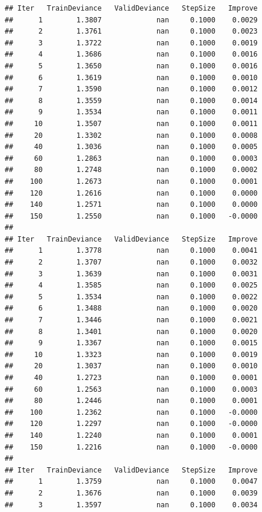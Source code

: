 \documentclass[]{article}
\begin{document}
\begin{verbatim}
## Iter   TrainDeviance   ValidDeviance   StepSize   Improve
##      1        1.3807             nan     0.1000    0.0029
##      2        1.3761             nan     0.1000    0.0023
##      3        1.3722             nan     0.1000    0.0019
##      4        1.3686             nan     0.1000    0.0016
##      5        1.3650             nan     0.1000    0.0016
##      6        1.3619             nan     0.1000    0.0010
##      7        1.3590             nan     0.1000    0.0012
##      8        1.3559             nan     0.1000    0.0014
##      9        1.3534             nan     0.1000    0.0011
##     10        1.3507             nan     0.1000    0.0011
##     20        1.3302             nan     0.1000    0.0008
##     40        1.3036             nan     0.1000    0.0005
##     60        1.2863             nan     0.1000    0.0003
##     80        1.2748             nan     0.1000    0.0002
##    100        1.2673             nan     0.1000    0.0001
##    120        1.2616             nan     0.1000    0.0000
##    140        1.2571             nan     0.1000    0.0000
##    150        1.2550             nan     0.1000   -0.0000
## 
## Iter   TrainDeviance   ValidDeviance   StepSize   Improve
##      1        1.3778             nan     0.1000    0.0041
##      2        1.3707             nan     0.1000    0.0032
##      3        1.3639             nan     0.1000    0.0031
##      4        1.3585             nan     0.1000    0.0025
##      5        1.3534             nan     0.1000    0.0022
##      6        1.3488             nan     0.1000    0.0020
##      7        1.3446             nan     0.1000    0.0021
##      8        1.3401             nan     0.1000    0.0020
##      9        1.3367             nan     0.1000    0.0015
##     10        1.3323             nan     0.1000    0.0019
##     20        1.3037             nan     0.1000    0.0010
##     40        1.2723             nan     0.1000    0.0001
##     60        1.2563             nan     0.1000    0.0003
##     80        1.2446             nan     0.1000    0.0001
##    100        1.2362             nan     0.1000   -0.0000
##    120        1.2297             nan     0.1000   -0.0000
##    140        1.2240             nan     0.1000    0.0001
##    150        1.2216             nan     0.1000   -0.0000
## 
## Iter   TrainDeviance   ValidDeviance   StepSize   Improve
##      1        1.3759             nan     0.1000    0.0047
##      2        1.3676             nan     0.1000    0.0039
##      3        1.3597             nan     0.1000    0.0034

\end{verbatim}
\end{document}
